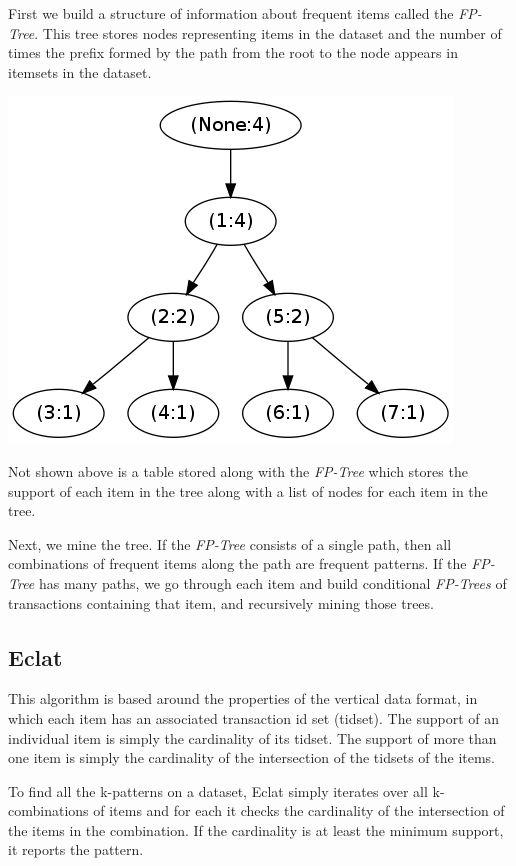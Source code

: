 \documentclass[11pt]{article}
\begin{document}
\begin{multicols}{2}
First we build a structure of information about frequent items called
the \emph{FP-Tree}.  This tree stores nodes representing items in the
dataset and the number of times the prefix formed by the path from the
root to the node appears in itemsets in the dataset.

\begin{center}
\includegraphics[scale=0.5]{../figs/tiny.png}
\end{center}

Not shown above is a table stored along with the \emph{FP-Tree} which
stores the support of each item in the tree along with a list of nodes
for each item in the tree.

Next, we mine the tree.  If the \emph{FP-Tree} consists of a single
path, then all combinations of frequent items along the path are
frequent patterns.  If the \emph{FP-Tree} has many paths, we go
through each item and build conditional \emph{FP-Trees} of
transactions containing that item, and recursively mining those trees.

\subsection{Eclat}

This algorithm is based around the properties of the vertical data
format, in which each item has an associated transaction id set
(tidset).  The support of an individual item is simply the cardinality
of its tidset.  The support of more than one item is simply the
cardinality of the intersection of the tidsets of the items.

To find all the k-patterns on a dataset, Eclat simply iterates over
all k-combinations of items and for each it checks the cardinality of
the intersection of the items in the combination.  If the cardinality
is at least the minimum support, it reports the pattern.


\end{multicols}
\end{document}
